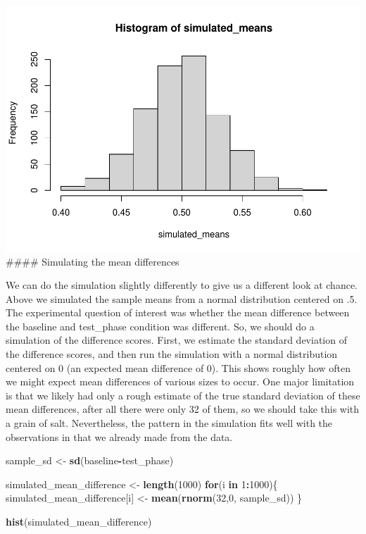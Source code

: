 \documentclass[
]{book}
\newenvironment{Shaded}{\begin{snugshade}}{\end{snugshade}}
\newcommand{\ControlFlowTok}[1]{\textcolor[rgb]{0.13,0.29,0.53}{\textbf{#1}}}
\newcommand{\DecValTok}[1]{\textcolor[rgb]{0.00,0.00,0.81}{#1}}
\newcommand{\FunctionTok}[1]{\textcolor[rgb]{0.13,0.29,0.53}{\textbf{#1}}}
\newcommand{\NormalTok}[1]{#1}
\newcommand{\OtherTok}[1]{\textcolor[rgb]{0.56,0.35,0.01}{#1}}
\newcommand{\SpecialCharTok}[1]{\textcolor[rgb]{0.81,0.36,0.00}{\textbf{#1}}}
\begin{document}
\includegraphics{Statistics_Lab_files/figure-latex/unnamed-chunk-182-1.pdf}
\#\#\#\# Simulating the mean differences

We can do the simulation slightly differently to give us a different look at chance. Above we simulated the sample means from a normal distribution centered on .5. The experimental question of interest was whether the mean difference between the baseline and test\_phase condition was different. So, we should do a simulation of the difference scores. First, we estimate the standard deviation of the difference scores, and then run the simulation with a normal distribution centered on 0 (an expected mean difference of 0). This shows roughly how often we might expect mean differences of various sizes to occur. One major limitation is that we likely had only a rough estimate of the true standard deviation of these mean differences, after all there were only 32 of them, so we should take this with a grain of salt. Nevertheless, the pattern in the simulation fits well with the observations in that we already made from the data.

\begin{Shaded}
\begin{Highlighting}[]
\NormalTok{sample\_sd   }\OtherTok{\textless{}{-}} \FunctionTok{sd}\NormalTok{(baseline}\SpecialCharTok{{-}}\NormalTok{test\_phase)}

\NormalTok{simulated\_mean\_difference }\OtherTok{\textless{}{-}} \FunctionTok{length}\NormalTok{(}\DecValTok{1000}\NormalTok{)}
\ControlFlowTok{for}\NormalTok{(i }\ControlFlowTok{in} \DecValTok{1}\SpecialCharTok{:}\DecValTok{1000}\NormalTok{)\{}
\NormalTok{ simulated\_mean\_difference[i] }\OtherTok{\textless{}{-}} \FunctionTok{mean}\NormalTok{(}\FunctionTok{rnorm}\NormalTok{(}\DecValTok{32}\NormalTok{,}\DecValTok{0}\NormalTok{, sample\_sd))}
\NormalTok{\}}

\FunctionTok{hist}\NormalTok{(simulated\_mean\_difference)}
\end{Highlighting}
\end{Shaded}
\end{document}
